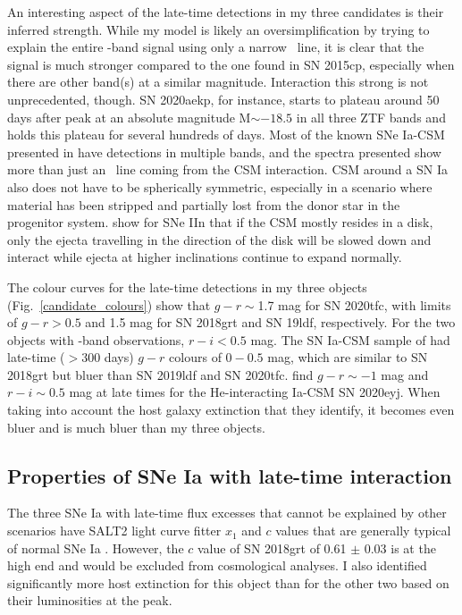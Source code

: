\documentclass[a4paper,oneside,12pt, class=Latex/Classes/PhDthesisPSnPDF, crop=false]{standalone}
\begin{document}
An interesting aspect of the late-time detections in my three candidates is their inferred strength. While my model is likely an oversimplification by trying to explain the entire \ztfr-band signal using only a narrow \Halpha~line, it is clear that the signal is much stronger compared to the one found in SN 2015cp, especially when there are other band(s) at a similar magnitude. Interaction this strong is not unprecedented, though. SN 2020aekp, for instance, starts to plateau around 50 days after peak at an absolute magnitude M$\sim-18.5$ in all three ZTF bands \citep{Ia-CSM_BTS} and holds this plateau for several hundreds of days. Most of the known SNe Ia-CSM presented in \citet{Ia-CSM_BTS} have detections in multiple bands, and the spectra presented show more than just an \Halpha~line coming from the CSM interaction. CSM around a SN Ia also does not have to be spherically symmetric, especially in a scenario where material has been stripped and partially lost from the donor star in the progenitor system. \citet{PTF11iqb} show for SNe IIn that if the CSM mostly resides in a disk, only the ejecta travelling in the direction of the disk will be slowed down and interact while ejecta at higher inclinations continue to expand normally.

The colour curves for the late-time detections in my three objects (Fig.~\ref{candidate_colours}) show that $g - r \sim$1.7 mag for SN 2020tfc, with limits of $g - r > 0.5$ and 1.5 mag for SN 2018grt and SN 19ldf, respectively. For the two objects with \ztfi-band observations, $r-i<0.5$ mag. The SN Ia-CSM sample of \cite{Ia-CSM_BTS} had late-time ($>300$ days) $g - r$ colours of $0 - 0.5$ mag, which are similar to SN 2018grt but bluer than SN 2019ldf and SN 2020tfc. \citet{Kool_He_CSM} find $g-r\sim-1$ mag and $r-i\sim0.5$ mag at late times for the He-interacting Ia-CSM SN 2020eyj. When taking into account the host galaxy extinction that they identify, it becomes even bluer and is much bluer than my three objects.


\subsection{Properties of SNe Ia with late-time interaction}
\label{discuss_prop}
The three SNe Ia with late-time flux excesses that cannot be explained by other scenarios have SALT2 light curve fitter $x_1$ and $c$ values that are generally typical of normal SNe Ia \citep{DR2_Overview}. However, the $c$ value of SN 2018grt of 0.61 $\pm$ 0.03 is at the high end and would be excluded from cosmological analyses. I also identified significantly more host extinction for this object than for the other two based on their luminosities at the peak.
\end{document}
